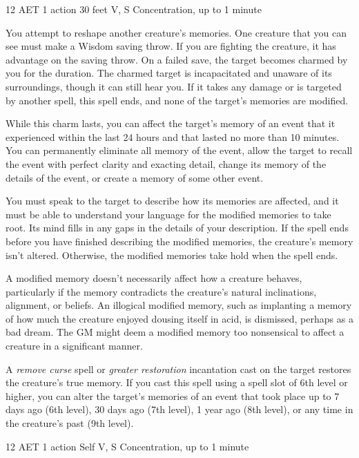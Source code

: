 \label{effect:modify-memory}
{12 AET}
{1 action}
{30 feet}
{V, S}
{Concentration, up to 1 minute}

You attempt to reshape another creature's memories. One creature that you can see must make a Wisdom saving throw. If you are fighting the creature, it has advantage on the saving throw. On a failed save, the target becomes charmed by you for the duration. The charmed target is incapacitated and unaware of its surroundings, though it can still hear you. If it takes any damage or is targeted by another spell, this spell ends, and none of the target's memories are modified.

While this charm lasts, you can affect the target's memory of an event that it experienced within the last 24 hours and that lasted no more than 10 minutes. You can permanently eliminate all memory of the event, allow the target to recall the event with perfect clarity and exacting detail, change its memory of the details of the event, or create a memory of some other event.

You must speak to the target to describe how its memories are affected, and it must be able to understand your language for the modified memories to take root. Its mind fills in any gaps in the details of your description. If the spell ends before you have finished describing the modified memories, the creature's memory isn't altered. Otherwise, the modified memories take hold when the spell ends.

A modified memory doesn't necessarily affect how a creature behaves, particularly if the memory contradicts the creature's natural inclinations, alignment, or beliefs. An illogical modified memory, such as implanting a memory of how much the creature enjoyed dousing itself in acid, is dismissed, perhaps as a bad dream. The GM might deem a modified memory too nonsensical to affect a creature in a significant manner.

A \textit{remove curse} spell or \textit{greater restoration} incantation cast on the target restores the creature's true memory.
{If you cast this spell using a spell slot of 6th level or higher, you can alter the target's memories of an event that took place up to 7 days ago (6th level), 30 days ago (7th level), 1 year ago (8th level), or any time in the creature's past (9th level).}

\label{spell:tree-stride}
{12 AET}
{1 action}
{Self}
{V, S}
{Concentration, up to 1 minute}

